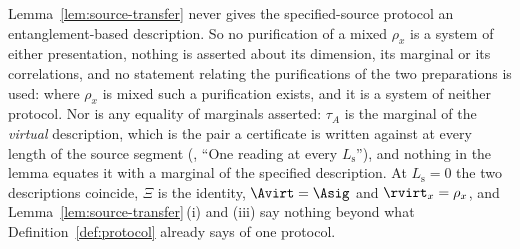 
\begin{remark}\label{rem:source-transfer-scope}
Lemma~\ref{lem:source-transfer} never gives the specified-source protocol an
entanglement-based description. So no purification of a mixed $\rho_x$ is a
system of either presentation, nothing is asserted about its dimension, its
marginal or its correlations, and no statement relating the purifications of
the two preparations is used: where $\rho_x$ is mixed such a purification
exists, and it is a system of neither protocol. Nor is any equality of
marginals asserted: $\tau_A$ is the marginal of the \emph{virtual}
description, which is the pair a certificate is written against at every
length of the source segment (, ``One reading at
every $L_{\mathrm s}$''), and nothing in the lemma equates it with a marginal
of the specified description. At $L_{\mathrm s}=0$ the two descriptions
coincide, $\Xi$ is the identity, $\Avirt=\Asig$ and $\rvirt_x=\rho_x$, and
Lemma~\ref{lem:source-transfer}\,(i) and (iii) say nothing beyond what
Definition~\ref{def:protocol} already says of one protocol.
\end{remark}
